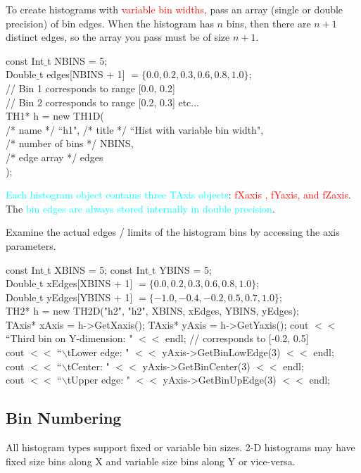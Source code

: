 \documentclass[12pt,a4paper]{article}
\begin{document}
To create histograms with \textcolor{red}{variable bin widths}, pass an array (single or double precision) of bin edges. When the histogram has $n$ bins, then there are $n+1$ distinct edges, so the array you pass must be of size $n+1$.

const Int$\_$t NBINS = 5; \\
Double$\_$t edges[NBINS + 1] $= \{0.0, 0.2, 0.3, 0.6, 0.8, 1.0\}$; \\
// Bin 1 corresponds to range [0.0, 0.2] \\
// Bin 2 corresponds to range [0.2, 0.3] etc... \\
TH1* h = new TH1D( \\
/* name */ ``h1",
/* title */ ``Hist with variable bin width", \\
/* number of bins */ NBINS, \\
/* edge array */ edges \\
);

\textcolor{cyan}{Each histogram object contains three TAxis objects}: \textcolor{red}{fXaxis , fYaxis, and fZaxis}. The \textcolor{cyan}{bin edges are always stored internally in double precision}.

Examine the actual edges / limits of the histogram bins by accessing the axis parameters.

const Int$\_$t XBINS = 5; const Int$\_$t YBINS = 5; \\
Double$\_$t xEdges[XBINS + 1] $= \{0.0, 0.2, 0.3, 0.6, 0.8, 1.0\}$; \\
Double$\_$t yEdges[YBINS + 1] $= \{-1.0, -0.4, -0.2, 0.5, 0.7, 1.0\}$; \\
TH2* h = new TH2D("h2", "h2", XBINS, xEdges, YBINS, yEdges); \\
TAxis* xAxis = h->GetXaxis(); TAxis* yAxis = h->GetYaxis();
cout $<<$ ``Third bin on Y-dimension: " $<<$ endl; // corresponds to [-0.2, 0.5] \\
cout $<<$ ``$\backslash$tLower edge: " $<<$ yAxis->GetBinLowEdge(3) $<<$ endl; \\
cout $<<$ ``$\backslash$tCenter: " $<<$ yAxis->GetBinCenter(3) $<<$ endl; \\
cout $<<$ ``$\backslash$tUpper edge: " $<<$ yAxis->GetBinUpEdge(3) $<<$ endl;

\subsection{Bin Numbering}
All histogram types support fixed or variable bin sizes. 2-D histograms may have fixed size bins along X and variable size bins along Y or vice-versa.
\end{document}
